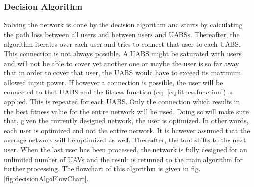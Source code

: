 \documentclass[twocolumn]{phdsymp} %
\begin{document}
\subsubsection{Decision Algorithm}

Solving the network is done by the decision algorithm and starts by calculating the path loss between all users and between users and \gls{UABS}s.
Thereafter, the algorithm iterates over each user and tries to connect that user to each \gls{UABS}. This connection is not always possible. A \gls{UABS} might be saturated with users and 
will not be able to cover yet another one or maybe the user is so far away that in order to cover that user, the \gls{UABS} would have to exceed its maximum allowed input power.
If however a connection is possible, the user will be connected to that \gls{UABS} and the fitness function (eq. \ref{eq:fitnessfunction}) is applied. 
This is repeated for each \gls{UABS}. Only the connection which results in the best fitness value for the entire network will be used.
Doing so will make sure that, given the currently designed network, the user is optimized. In other words, each user is optimized and 
not the entire network. It is however assumed that the average network will be optimized as well.
 Thereafter, the tool shifts to the next user. 
When the last user has been processed, the network is fully designed for an unlimited number of \gls{UAV}s and the result is returned to the main algorithm for further processing.
The flowchart of this algorithm is given in fig. \ref{fig:decisionAlgoFlowChart}.
\end{document}
